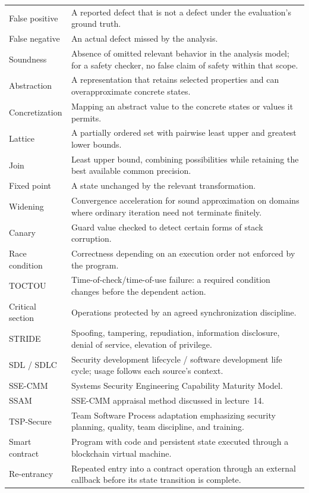\documentclass[11pt,a4paper]{article}
\numberwithin{figure}{section}
\begin{document}
\begin{longtable}{@{}>{\raggedright\arraybackslash}p{34mm}>{\raggedright\arraybackslash}p{115mm}@{}}
False positive & A reported defect that is not a defect under the evaluation's ground truth.\\
False negative & An actual defect missed by the analysis.\\
Soundness & Absence of omitted relevant behavior in the analysis model; for a safety checker, no false claim of safety within that scope.\\
Abstraction & A representation that retains selected properties and can overapproximate concrete states.\\
Concretization & Mapping an abstract value to the concrete states or values it permits.\\
Lattice & A partially ordered set with pairwise least upper and greatest lower bounds.\\
Join & Least upper bound, combining possibilities while retaining the best available common precision.\\
Fixed point & A state unchanged by the relevant transformation.\\
Widening & Convergence acceleration for sound approximation on domains where ordinary iteration need not terminate finitely.\\
Canary & Guard value checked to detect certain forms of stack corruption.\\
Race condition & Correctness depending on an execution order not enforced by the program.\\
TOCTOU & Time-of-check/time-of-use failure: a required condition changes before the dependent action.\\
Critical section & Operations protected by an agreed synchronization discipline.\\
STRIDE & Spoofing, tampering, repudiation, information disclosure, denial of service, elevation of privilege.\\
SDL / SDLC & Security development lifecycle / software development life cycle; usage follows each source's context.\\
SSE-CMM & Systems Security Engineering Capability Maturity Model.\\
SSAM & SSE-CMM appraisal method discussed in lecture~14.\\
TSP-Secure & Team Software Process adaptation emphasizing security planning, quality, team discipline, and training.\\
Smart contract & Program with code and persistent state executed through a blockchain virtual machine.\\
Re-entrancy & Repeated entry into a contract operation through an external callback before its state transition is complete.\\

\end{longtable}
\end{document}
